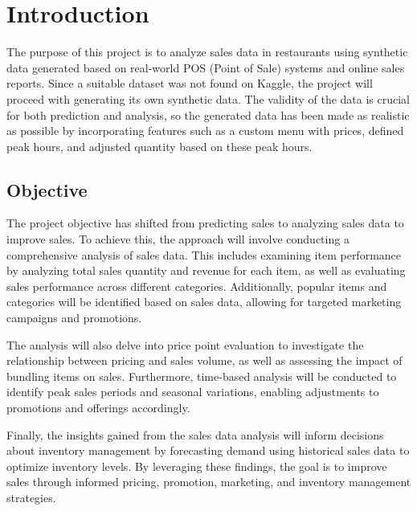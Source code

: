 \section{Introduction}

The purpose of this project is to analyze sales data in restaurants using synthetic data generated based on real-world POS (Point of Sale) systems and online sales reports. Since a suitable dataset was not found on Kaggle, the project will proceed with generating its own synthetic data. The validity of the data is crucial for both prediction and analysis, so the generated data has been made as realistic as possible by incorporating features such as a custom menu with prices, defined peak hours, and adjusted quantity based on these peak hours.

\subsection{Objective}
\label{subsection:objective}

The project objective has shifted from predicting sales to analyzing sales data to improve sales. To achieve this, the approach will involve conducting a comprehensive analysis of sales data. This includes examining item performance by analyzing total sales quantity and revenue for each item, as well as evaluating sales performance across different categories. Additionally, popular items and categories will be identified based on sales data, allowing for targeted marketing campaigns and promotions.

The analysis will also delve into price point evaluation to investigate the relationship between pricing and sales volume, as well as assessing the impact of bundling items on sales. Furthermore, time-based analysis will be conducted to identify peak sales periods and seasonal variations, enabling adjustments to promotions and offerings accordingly.

Finally, the insights gained from the sales data analysis will inform decisions about inventory management by forecasting demand using historical sales data to optimize inventory levels. By leveraging these findings, the goal is to improve sales through informed pricing, promotion, marketing, and inventory management strategies.

